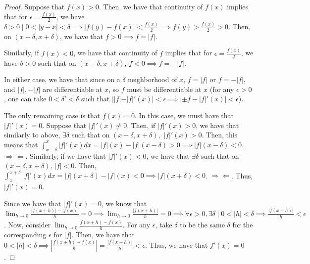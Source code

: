 \documentclass[12pt,letterpaper]{article}
\theoremstyle{definition}
\newcommand{\contra}{\Rightarrow\!\Leftarrow}
\begin{document}
\begin{proof}
  Suppose that $f(x) > 0$. Then, we have that continuity of $f(x)$ implies that
  for $\epsilon = \frac{f(x)}{2}$, we have $\delta > 0 \mid 0 < |y - x| < \delta
  \implies |f(y) - f(x)| < \frac{f(x)}{2} \implies f(y) > \frac{f(x)}{2} > 0$.
  Then, on $(x - \delta, x + \delta)$, we have that $f > 0 \implies f = |f|$.

  Similarly, if $f(x) < 0$, we have that continuity of $f$ implies that for
  $\epsilon = \frac{f(x)}{2}$, we have $\delta > 0$ such that on $(x - \delta, x
  + \delta)$, $f < 0 \implies f = -|f|$.

  In either case, we have that since on a $\delta$ neighborhood of $x$, $f = |f|$
  or $f = -|f|$, and $|f|, -|f|$ are differentiable at $x$, so $f$ must be
  differentiable at $x$ (for any $\epsilon > 0$, one can take $0 < \delta' < \delta$
  such that $||f| - |f|'(x)| < \epsilon \implies |\pm f - |f|'(x)| < \epsilon$).

  The only remaining case is that $f(x) = 0$. In this case, we must have that
  $|f|'(x) = 0$. Suppose that $|f|'(x) \neq 0$. Then, if $|f|'(x) > 0$, we have
  that similarly to above, $\exists \delta$ such that on $(x-\delta, x +
  \delta),$ $|f|'(x) > 0$. Then, this means that $\int_{x-\delta}^x|f|'(x)dx =
  |f|(x) - |f|(x - \delta) > 0 \implies |f|(x -\delta) < 0$. $\contra$.
  Similarly, if we have that $|f|'(x) < 0$, we have that $\exists \delta$ such
  that on $(x- \delta, x +\delta)$, $|f| < 0$. Then, $\int_x^{x+\delta}|f|'(x)dx
  = |f|(x+\delta) - |f|(x) < 0 \implies |f|(x+\delta) < 0$. $\contra$. Thus,
  $|f|'(x) = 0$.

  Since we have that $|f|'(x) = 0$, we know that $\lim_{h\rightarrow
    0}\frac{|f(x+h)|-|f(x)|}{h} = 0 \implies \lim_{h\rightarrow
    0}\frac{|f(x+h)|}{h} = 0 \implies \forall \epsilon > 0, \exists \delta \mid
  0 < |h| < \delta \implies \frac{|f(x+h)|}{|h|} < \epsilon$. Now, consider
  $\lim_{h\rightarrow 0}\frac{f(x+h) - f(x)}{h}$. For
  any $\epsilon$, take $\delta$ to be the same $\delta$ for the corresponding
  $\epsilon$ for $|f|$. Then, we have that $0 < |h| < \delta \implies
  |\frac{f(x+h) - f(x)}{h}| = \frac{|f(x+h)|}{|h|} < \epsilon$. Thus, we have
  that $f'(x) = 0$.
\end{proof}
\end{document}
